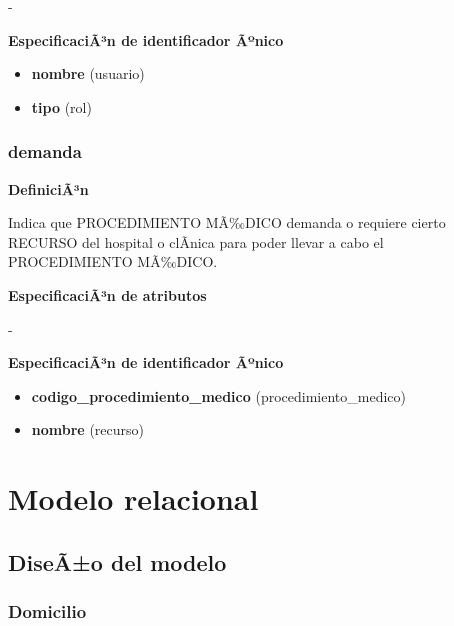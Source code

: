 \documentclass[a4paper,11pt]{article}
\begin{document}
-

\textbf{EspecificaciÃ³n de identificador Ãºnico}

\begin{itemize}

     \item \textbf{nombre} (usuario)

     \item \textbf{tipo} (rol)

\end{itemize}

\subsubsection{\textbf{demanda}}

\textbf{DefiniciÃ³n}

Indica que PROCEDIMIENTO MÃ‰DICO demanda o requiere cierto RECURSO del hospital o clÃ­nica
para poder llevar a cabo el PROCEDIMIENTO MÃ‰DICO.

\textbf{EspecificaciÃ³n de atributos}

-

\textbf{EspecificaciÃ³n de identificador Ãºnico}

\begin{itemize}

     \item \textbf{codigo\_procedimiento\_medico} (procedimiento\_medico)

     \item \textbf{nombre} (recurso)

\end{itemize}

\newpage

\section{\textbf{Modelo relacional\label{HToc293405831}}}

\subsection{\textbf{DiseÃ±o del modelo\label{HToc293405832}}}

\subsubsection{\textbf{Domicilio}}
\end{document}
